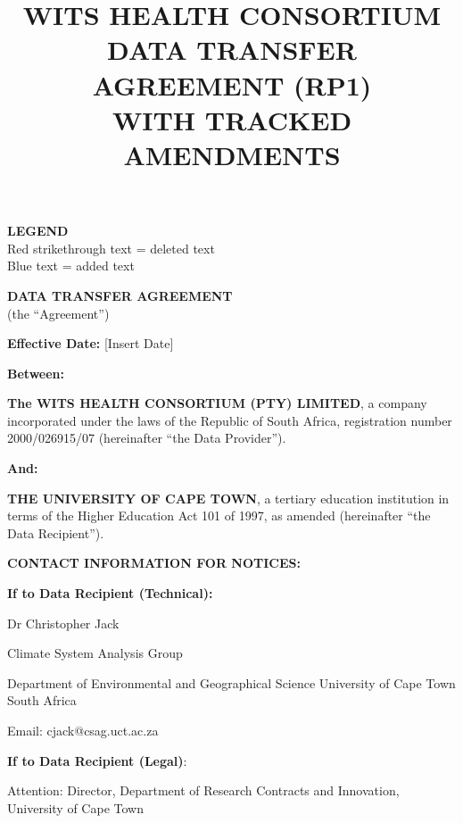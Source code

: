 \documentclass[12pt,letterpaper]{article}
\title{\textbf{WITS HEALTH CONSORTIUM\\DATA TRANSFER AGREEMENT (RP1)\\WITH TRACKED AMENDMENTS}}
\author{}
\date{}
\begin{document}
\maketitle

\begin{center}
\textbf{LEGEND}\\
\textcolor{deletecolor}{Red strikethrough text} = deleted text\\
\textcolor{addcolor}{Blue text} = added text
\end{center}

\vspace{1cm}

\begin{center}
\textbf{\Large DATA TRANSFER AGREEMENT}\\
\vspace{0.5cm}
(the ``Agreement'')
\end{center}

\vspace{0.5cm}

\textbf{Effective Date:} [Insert Date]

\textbf{Between:}

\textbf{The WITS HEALTH CONSORTIUM (PTY) LIMITED}, a company incorporated under the laws of the Republic of South Africa, registration number 2000/026915/07 (hereinafter ``the Data Provider'').

\vspace{0.2cm}

\textbf{And:}

\textbf{THE UNIVERSITY OF CAPE TOWN}, a tertiary education institution in terms of the Higher Education Act 101 of 1997, as amended (hereinafter ``the Data Recipient'').

\vspace{0.5cm}

\textbf{CONTACT INFORMATION FOR NOTICES:}

\textbf{If to Data Recipient (Technical):}

Dr Christopher Jack

Climate System Analysis Group

Department of Environmental and Geographical Science University of Cape Town South Africa

Email: cjack@csag.uct.ac.za

\textbf{If to Data Recipient (Legal)}:

Attention: Director, Department of Research Contracts and Innovation, University of Cape Town
\end{document}

